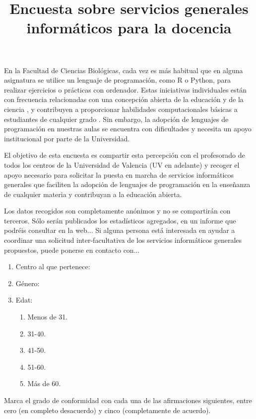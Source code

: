 \documentclass[a4paper,12pt]{article}
\title{Encuesta sobre servicios generales informáticos para la docencia}
\begin{document}
\maketitle
En la Facultad de Ciencias Biológicas, cada vez es más habitual que en alguna
asignatura se utilice un lenguaje de programación, como R o Python,
para realizar ejercicios o prácticas con ordenador. Estas iniciativas individuales
están con frecuencia relacionadas con una concepción abierta de la educación y de
la ciencia \cite{Schlagwein2017}, y contribuyen a proporcionar habilidades
computacionales básicas a estudiantes de cualquier grado \cite{Vee2017}. Sin embargo,
la adopción de lenguajes de programación en nuestras aulas se encuentra con
dificultades y necesita un apoyo institucional por parte de la Universidad.

El objetivo de esta encuesta es compartir esta percepción con el profesorado de todos
los centros de la Universidad de Valencia (UV en adelante) y recoger el apoyo
necesario para solicitar la puesta en marcha de servicios informáticos generales
que faciliten la adopción de lenguajes de programación en la enseñanza de cualquier
materia y contribuyan a la educación abierta.

Los datos recogidos son completamente anónimos y no se compartirán con terceros.
Sólo serán publicados los estadísticos agregados, en un informe que podréis consultar
en la web... Si alguna persona está interesada en ayudar a coordinar una solicitud
inter-facultativa de los servicios informáticos generales propuestos, puede ponerse
en contacto con...

\begin{enumerate}
\item Centro al que pertenece:
\item Género:
\item Edat:
   \begin{enumerate}
   \item Menos de 31.
   \item 31-40.
   \item 41-50.
   \item 51-60.
   \item Más de 60.
   \end{enumerate}
\end{enumerate}

Marca el grado de conformidad con cada una de las afirmaciones siguientes, entre cero
(en completo desacuerdo) y cinco (completamente de acuerdo).
\end{document}
